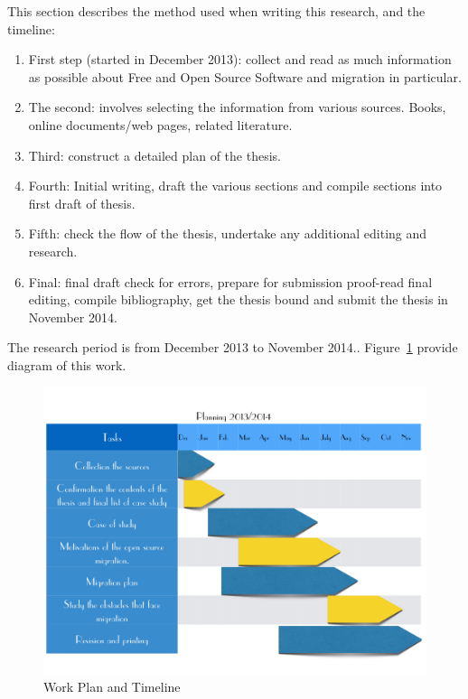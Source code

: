   This section describes the method used when writing this research, and the timeline:
\begin{enumerate}[itemsep=0ex]
  \item  First step (started in December 2013): collect and read as much information as possible about Free and Open Source Software and migration in particular.
  \item The second: involves selecting the information from various sources. Books, online documents/web pages, related literature.
  \item Third: construct a detailed plan of the thesis.
  \item Fourth: Initial writing, draft the various sections and compile sections into first draft of thesis. 
  \item Fifth: check the flow of the thesis, undertake any additional editing and research. 
  \item Final: final draft check for errors, prepare for submission proof-read  final editing, compile bibliography, get the thesis bound and submit the thesis in November 2014.
\end{enumerate}
 
The research period is from December 2013 to November 2014.. Figure~\ref{fig:planning} provide diagram of this work.

   \begin{figure}
    \centering
        \includegraphics[scale=0.45]{img/planning.jpg}
      \caption{Work Plan and Timeline}
      \label{fig:planning}
    \end{figure}

